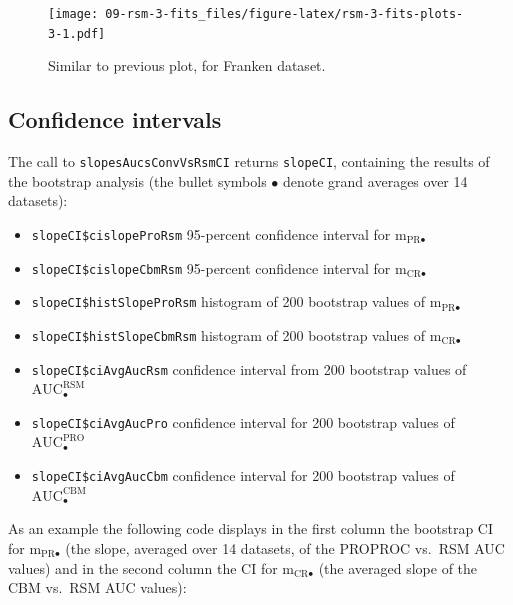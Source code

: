 \documentclass[
]{book}
\newenvironment{Shaded}{\begin{snugshade}}{\end{snugshade}}
\newcommand{\FunctionTok}[1]{\textcolor[rgb]{0.00,0.00,0.00}{#1}}
\newcommand{\NormalTok}[1]{#1}
\newcommand{\OtherTok}[1]{\textcolor[rgb]{0.56,0.35,0.01}{#1}}
\newcommand{\SpecialCharTok}[1]{\textcolor[rgb]{0.00,0.00,0.00}{#1}}
\newcommand{\StringTok}[1]{\textcolor[rgb]{0.31,0.60,0.02}{#1}}
\providecommand{\tightlist}{%
  \setlength{\itemsep}{0pt}\setlength{\parskip}{0pt}}
\begin{document}
\begin{figure}
\centering
\texttt{[image: 09-rsm-3-fits\_files/figure-latex/rsm-3-fits-plots-3-1.pdf]}
\caption{\label{fig:rsm-3-fits-plots-3}Similar to previous plot, for Franken dataset.}
\end{figure}

\hypertarget{rsm-3-fits-confidence-intervals}{%
\subsection{Confidence intervals}\label{rsm-3-fits-confidence-intervals}}

The call to \texttt{slopesAucsConvVsRsmCI} returns \texttt{slopeCI}, containing the results of the bootstrap analysis (the bullet symbols \(\bullet\) denote grand averages over 14 datasets):

\begin{itemize}
\tightlist
\item
  \texttt{slopeCI\$cislopeProRsm} 95-percent confidence interval for \(\text{m}_{\text{PR} \bullet}\)
\item
  \texttt{slopeCI\$cislopeCbmRsm} 95-percent confidence interval for \(\text{m}_{\text{CR} \bullet}\)
\item
  \texttt{slopeCI\$histSlopeProRsm} histogram of 200 bootstrap values of \(\text{m}_{\text{PR} \bullet}\)
\item
  \texttt{slopeCI\$histSlopeCbmRsm} histogram of 200 bootstrap values of \(\text{m}_{\text{CR} \bullet}\)
\item
  \texttt{slopeCI\$ciAvgAucRsm} confidence interval from 200 bootstrap values of \(\text{AUC}^{\text{RSM}}_\bullet\)
\item
  \texttt{slopeCI\$ciAvgAucPro} confidence interval for 200 bootstrap values of \(\text{AUC}^{\text{PRO}}_\bullet\)
\item
  \texttt{slopeCI\$ciAvgAucCbm} confidence interval for 200 bootstrap values of \(\text{AUC}^{\text{CBM}}_\bullet\)
\end{itemize}

As an example the following code displays in the first column the bootstrap CI for \(\text{m}_{\text{PR} \bullet}\) (the slope, averaged over 14 datasets, of the PROPROC vs.~RSM AUC values) and in the second column the CI for \(\text{m}_{\text{CR} \bullet}\) (the averaged slope of the CBM vs.~RSM AUC values):

\begin{Shaded}
\end{Shaded}
\end{document}
